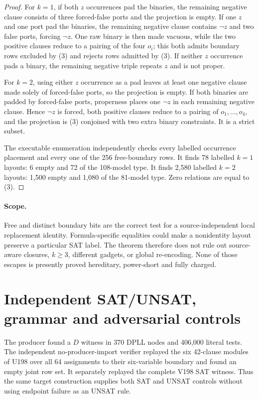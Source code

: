 \documentclass[11pt]{article}
\begin{document}
\begin{proof}
For $k=1$, if both $z$ occurrences pad the binaries, the remaining negative
clause consists of three forced-false ports and the projection is empty.  If
one $z$ and one port pad the binaries, the remaining negative clause contains
$\neg z$ and two false ports, forcing $\neg z$.  One raw binary is then made
vacuous, while the two positive clauses reduce to a pairing of the four $o_i$;
this both admits boundary rows excluded by (3) and rejects rows admitted by
(3).  If neither $z$ occurrence pads a binary, the remaining negative triple
repeats $z$ and is not proper.

For $k=2$, using either $z$ occurrence as a pad leaves at least one negative
clause made solely of forced-false ports, so the projection is empty.  If both
binaries are padded by forced-false ports, properness places one $\neg z$ in
each remaining negative clause.  Hence $\neg z$ is forced, both positive
clauses reduce to a pairing of $o_1,\ldots,o_4$, and the projection is (3)
conjoined with two extra binary constraints.  It is a strict subset.

The executable enumeration independently checks every labelled occurrence
placement and every one of the 256 free-boundary rows.  It finds 78 labelled
$k=1$ layouts: 6 empty and 72 of the 108-model type.  It finds 2,580 labelled
$k=2$ layouts: 1,500 empty and 1,080 of the 81-model type.  Zero relations are
equal to (3).
\end{proof}

\paragraph{Scope.}
Free and distinct boundary bits are the correct test for a
source-independent local replacement identity.  Formula-specific equalities
could make a nonidentity layout preserve a particular SAT label.  The theorem
therefore does not rule out source-aware closures, $k\ge3$, different gadgets,
or global re-encoding.  None of those escapes is presently proved hereditary,
power-short and fully charged.

\section{Independent SAT/UNSAT, grammar and adversarial controls}

The producer found a $D$ witness in 370 DPLL nodes and 406,000 literal tests.
The independent no-producer-import verifier replayed the six 42-clause modules
of U198 over all 64 assignments to their six-variable boundary and found an
empty joint row set.  It separately replayed the complete V198 SAT witness.
Thus the same target construction supplies both SAT and UNSAT controls without
using endpoint failure as an UNSAT rule.
\end{document}
